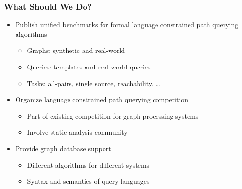 \documentclass[xcolor=table,aspectratio=169]{beamer}
\begin{document}
\begin{frame}[fragile]
  \frametitle{What Should We Do?}
  \begin{itemize}
    \item[\faRoad] Publish unified benchmarks for formal language constrained path querying algorithms
    \begin{itemize}
      \item Graphs: synthetic and real-world
      \item Queries: templates and real-world queries
      \item Tasks: all-pairs, single source, reachability, \ldots            
    \end{itemize}
    \pause
    \item[\faRoad] Organize language constrained path querying competition
    \begin{itemize}
      \item Part of existing competition for graph processing systems
      \item Involve static analysis community
    \end{itemize}
    \pause
    \item[\faQuestion] Provide graph database support
    \begin{itemize}
      \item Different algorithms for different systems
      \item Syntax and semantics of query languages 
    \end{itemize}
  \end{itemize}
\end{frame}
\end{document}
